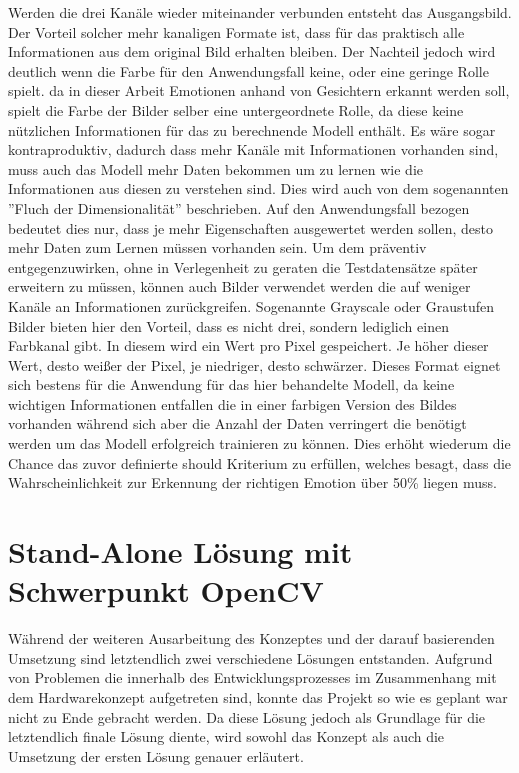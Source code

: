 \documentclass[12pt, a4paper]{scrbook}
\begin{document}
Werden die drei Kanäle wieder miteinander verbunden entsteht das Ausgangsbild. Der Vorteil solcher mehr kanaligen Formate ist, dass für das praktisch alle Informationen aus dem original Bild erhalten bleiben. Der Nachteil jedoch wird deutlich wenn die Farbe für den Anwendungsfall keine, oder eine geringe Rolle spielt. da in dieser Arbeit Emotionen anhand von Gesichtern erkannt werden soll, spielt die Farbe der Bilder selber eine untergeordnete Rolle, da diese keine nützlichen Informationen für das zu berechnende Modell enthält. Es wäre sogar kontraproduktiv, dadurch dass mehr Kanäle mit Informationen vorhanden sind, muss auch das Modell mehr Daten bekommen um zu lernen wie die Informationen aus diesen zu verstehen sind. Dies wird auch von dem sogenannten ''Fluch der Dimensionalität'' beschrieben. Auf den Anwendungsfall bezogen bedeutet dies nur, dass je mehr Eigenschaften ausgewertet werden sollen, desto mehr Daten zum Lernen müssen vorhanden sein. Um dem präventiv entgegenzuwirken, ohne in Verlegenheit zu geraten die Testdatensätze später erweitern zu müssen, können auch Bilder verwendet werden die auf weniger Kanäle an Informationen zurückgreifen. Sogenannte Grayscale oder Graustufen Bilder bieten hier den Vorteil, dass es nicht drei, sondern lediglich einen Farbkanal gibt. In diesem wird ein Wert pro Pixel gespeichert. Je höher dieser Wert, desto weißer der Pixel, je niedriger, desto schwärzer. Dieses Format eignet sich bestens für die Anwendung für das hier behandelte Modell, da keine wichtigen Informationen entfallen die in einer farbigen Version des Bildes vorhanden während sich aber die Anzahl der Daten verringert die benötigt werden um das Modell erfolgreich trainieren zu können. Dies erhöht wiederum die Chance das zuvor definierte should Kriterium zu erfüllen, welches besagt, dass die Wahrscheinlichkeit zur Erkennung der richtigen Emotion über  50\% liegen muss. 
\let\cleardoublepage\relax

\chapter{Stand-Alone Lösung mit Schwerpunkt OpenCV}
Während der weiteren Ausarbeitung des Konzeptes und der darauf basierenden Umsetzung sind letztendlich zwei verschiedene Lösungen entstanden. Aufgrund von Problemen die innerhalb des Entwicklungsprozesses im Zusammenhang mit dem Hardwarekonzept aufgetreten sind, konnte das Projekt so wie es geplant war nicht zu Ende gebracht werden. Da diese Lösung jedoch als Grundlage für die letztendlich finale Lösung diente, wird sowohl das Konzept als auch die Umsetzung der ersten Lösung genauer erläutert.
\end{document}
